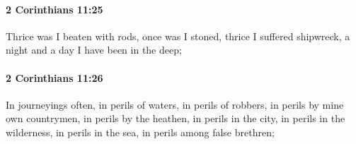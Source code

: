		\paragraph{2 Corinthians 11:25} %
			\label{2CORINTHIANS-11-25}

			Thrice was I beaten with rods, once was I stoned, thrice I suffered shipwreck, a night and a day I have been in the deep;

			\begin{framed}
			\scriptsize
				\begin{compactdesc}
					\item[SBLG] 
				\end{compactdesc}
			\end{framed}

		\paragraph{2 Corinthians 11:26} %
			\label{2CORINTHIANS-11-26}

			In journeyings often, in perils of waters, in perils of robbers, in perils by mine own countrymen, in perils by the heathen, in perils in the city, in perils in the wilderness, in perils in the sea, in perils among false brethren;


